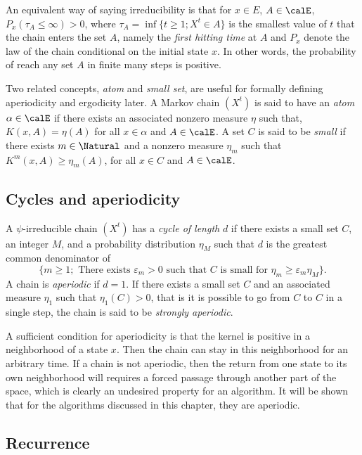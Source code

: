 An equivalent way of saying irreducibility is that for $x\in E$, $A\in\calE$,
$P_x(\tau_A\le\infty) > 0$, where $\tau_A = \inf\{t\ge1;X^t\in A\}$ is the
smallest value of $t$ that the chain enters the set $A$, namely the
\emph{first hitting time} at $A$ and $P_x$ denote the law of the chain
conditional on the initial state $x$. In other words, the probability of
reach any set $A$ in finite many steps is positive.

Two related concepts, \emph{atom} and \emph{small set}, are useful for
formally defining aperiodicity and ergodicity later. A Markov chain $(X^t)$
is said to have an \emph{atom} $\alpha\in\calE$ if there exists an associated
nonzero measure $\eta$ such that, $K(x,A) = \eta(A)$ for all $x\in\alpha$ and
$A\in\calE$. A set $C$ is said to be \emph{small} if there exists
$m\in\Natural$ and a nonzero measure $\eta_m$ such that
$K^m(x,A)\ge\eta_m(A)$, for all $x\in C$ and $A\in\calE$.

\subsection{Cycles and aperiodicity}
\label{sub: Appdendix Cycles and Aperiodicity}

A $\psi$-irreducible chain $(X^t)$ has a \emph{cycle of length} $d$ if there
exists a small set $C$, an integer $M$, and a probability distribution
$\eta_M$ such that $d$ is the greatest common denominator of
\begin{equation*}
  \{m\ge1;\text{ There exists }\varepsilon_m > 0\text{ such that }C\text{ is
    small for }\eta_m\ge\varepsilon_m\eta_M\}.
\end{equation*}
A chain is \emph{aperiodic} if $d = 1$. If there exists a small set $C$ and
an associated measure $\eta_1$ such that $\eta_1(C) > 0$, that is it is
possible to go from $C$ to $C$ in a single step, the chain is said to be
\emph{strongly aperiodic}.

A sufficient condition for aperiodicity is that the kernel is positive in a
neighborhood of a state $x$. Then the chain can stay in this neighborhood for
an arbitrary time. If a chain is not aperiodic, then the return from one
state to its own neighborhood will requires a forced passage through another
part of the space, which is clearly an undesired property for an \mcmc
algorithm. It will be shown that for the algorithms discussed in this
chapter, they are aperiodic.

\subsection{Recurrence}
\label{sub: Appdendix Recurrence}

